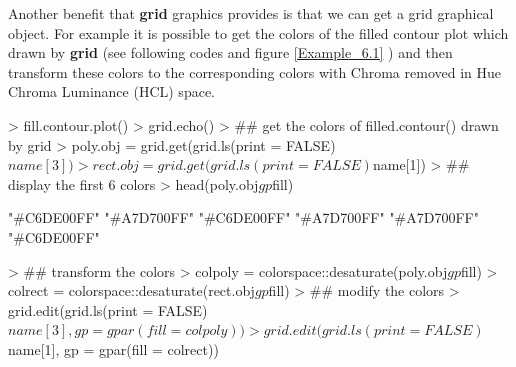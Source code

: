 \documentclass[11pt]{report}
\begin{document}
\newpage
Another benefit that \textbf{grid} graphics provides is that we can get a grid graphical object. For example it is possible to get the colors of the filled contour plot which drawn by \textbf{grid} (see following codes and figure \ref{Example_6.1} ) and then transform these colors to the corresponding colors with Chroma removed in Hue Chroma Luminance (HCL) space.
\begin{Schunk}
\begin{Sinput}
> fill.contour.plot()
> grid.echo()
> ## get the colors of filled.contour() drawn by grid
> poly.obj = grid.get(grid.ls(print = FALSE)$name[3])
> rect.obj = grid.get(grid.ls(print = FALSE)$name[1])
> ## display the first 6 colors
> head(poly.obj$gp$fill)
\end{Sinput}
\begin{Soutput}
[1] "#C6DE00FF" "#A7D700FF" "#C6DE00FF" "#A7D700FF" "#A7D700FF" "#C6DE00FF"
\end{Soutput}
\begin{Sinput}
> ## transform the colors
> colpoly = colorspace::desaturate(poly.obj$gp$fill)
> colrect = colorspace::desaturate(rect.obj$gp$fill)
> ## modify the colors
> grid.edit(grid.ls(print = FALSE)$name[3], gp = gpar(fill = colpoly))
> grid.edit(grid.ls(print = FALSE)$name[1], gp = gpar(fill = colrect))
\end{Sinput}
\end{Schunk}
\end{document}
